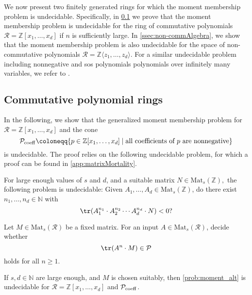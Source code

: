 We now present two finitely generated rings for which the moment membership problem is undecidable. Specifically, in \cref{ssec:commAlgebra} we prove that the moment membership problem is undecidable for the ring of commutative polynomials $\mathcal{R} = \mathbb{Z}[x_1, \ldots, x_d]$ if $n$ is sufficiently large. In \cref{ssec:non-commAlgebra}, we show that the moment membership problem is also undecidable for the space of non-commutative polynomials $\mathcal{R} = \mathbb{Z}\langle z_1, \ldots, z_d \rangle$. For a similar undecidable problem including nonnegative and sos polynomials polynomials over infinitely many variables, we refer to \cite[Section 6]{De21b}.


\subsection{Commutative polynomial rings}
\label{ssec:commAlgebra}

In the following, we show that the generalized moment membership problem for  $\mathcal R=\mathbb{Z}[x_1, \ldots, x_d]$ and the cone
$$\mathcal{P}_{\rm coeff} \coloneqq \{p \in \mathbb{Z}[x_1, \ldots, x_d]\mid  \text{all coefficients of } p \text{ are nonnegative}\}$$
is undecidable. The proof relies on the following undecidable problem, for which a proof can be found in \cref{app:matrixMortality}. 

\begin{lemma}\label{lem:trace_undec} For large enough values of $s$ and $d$, and a suitable matrix $N \in \mathrm{Mat}_s(\mathbb{Z}),$  the following 
problem is undecidable: Given $A_1, \ldots, A_d \in \mathrm{Mat}_s(\mathbb{Z})$, do there exist  $ n_1, \ldots, n_d \in \mathbb{N}$ with $$\tr(A_1^{n_1} \cdot A_2^{n_2} \cdots A_d^{n_d} \cdot N) < 0?$$
\end{lemma}


\begin{problem} 
\label{prob:moment_alt}
Let $M \in \mathrm{Mat}_s(\mathcal{R})$ be a fixed matrix.
For an input $A \in \mathrm{Mat}_s(\mathcal{R})$, decide whether
$$ \tr(A^n \cdot M) \in \mathcal{P}$$ holds for all $n\geqslant 1$.
\end{problem}

\begin{theorem}\label{thm:undec-com}
If $s, d \in \mathbb{N}$ are large enough, and $M$ is chosen suitably, then \cref{prob:moment_alt} is undecidable for $\mathcal{R} = \mathbb{Z}[x_1, \ldots, x_d]$ and $\mathcal{P}_{\rm coeff}$.
\end{theorem}

